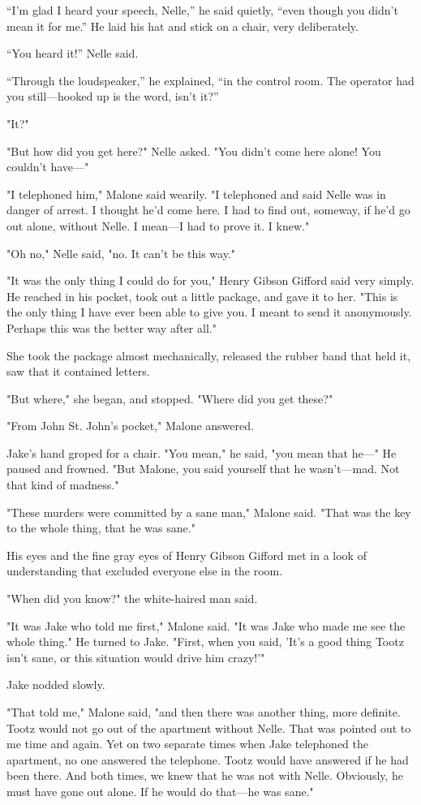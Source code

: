 \documentclass{novel}
\begin{document}
“I’m glad I heard your speech, Nelle,” he said quietly, “even though you didn’t mean it for me.” He laid his hat and stick on a chair, very deliberately.

“You heard it!” Nelle said.

“Through the loudspeaker,” he explained, “in the control room. The operator had you still—hooked up is the word, isn’t it?”

"It?"

"But how did you get here?" Nelle asked. "You didn’t come here alone! You couldn’t have—"

"I telephoned him," Malone said wearily. "I telephoned and said Nelle was in danger of arrest. I thought he’d come here. I had to find out, someway, if he’d go out alone, without Nelle. I mean—I had to prove it. I knew."

"Oh no," Nelle said, "no. It can’t be this way."

"It was the only thing I could do for you," Henry Gibson Gifford said very simply. He reached in his pocket, took out a little package, and gave it to her. "This is the only thing I have ever been able to give you. I meant to send it anonymously. Perhaps this was the better way after all."

She took the package almost mechanically, released the rubber band that held it, saw that it contained letters.

"But where," she began, and stopped. "Where did you get these?"

"From John St. John’s pocket," Malone answered.

Jake’s hand groped for a chair. "You mean," he said, "you mean that he—" He paused and frowned. "But Malone, you said yourself that he wasn’t—mad. Not that kind of madness."

"These murders were committed by a sane man," Malone said. "That was the key to the whole thing, that he was sane."

His eyes and the fine gray eyes of Henry Gibson Gifford met in a look of understanding that excluded everyone else in the room.

"When did you know?" the white-haired man said.

"It was Jake who told me first," Malone said. "It was Jake who made me see the whole thing." He turned to Jake. "First, when you said, 'It’s a good thing Tootz isn’t sane, or this situation would drive him crazy!'"

Jake nodded slowly.

"That told me," Malone said, "and then there was another thing, more definite. Tootz would not go out of the apartment without Nelle. That was pointed out to me time and again. Yet on two separate times when Jake telephoned the apartment, no one answered the telephone. Tootz would have answered if he had been there. And both times, we knew that he was not with Nelle. Obviously, he must have gone out alone. If he would do that—he was sane."
\end{document}
